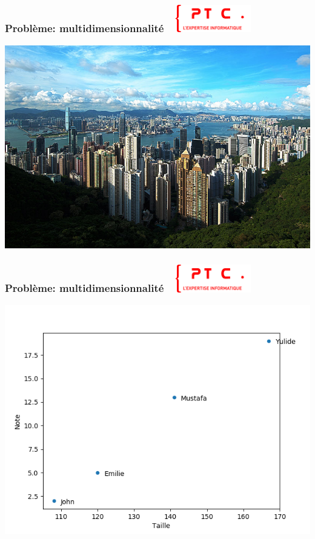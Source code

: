 \documentclass[11pt]{beamer}
\newenvironment{slide}[1]{%
\begin{frame}[environment=slide]
\frametitle{#1~\hfill~\includegraphics[height=1.2cm]{./epitech.png}}
}{%
\end{frame}
}
\begin{document}
\begin{slide}{Problème: multidimensionnalité}

\begin{center}

\includegraphics[scale=0.95]{hongkong}

\end{center}
\end{slide}

\begin{slide}{Problème: multidimensionnalité}

\begin{center}

\includegraphics[scale=0.4]{plot1}

\end{center}
\end{slide}
\end{document}
